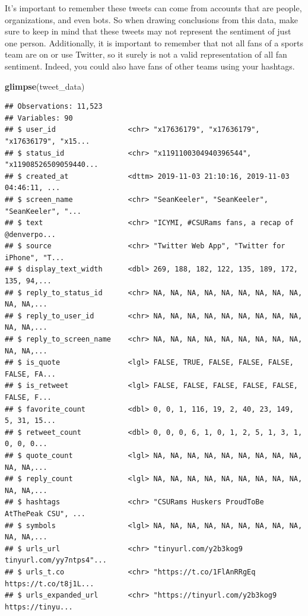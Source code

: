 \documentclass[]{book}
\newenvironment{Shaded}{\begin{snugshade}}{\end{snugshade}}
\newcommand{\KeywordTok}[1]{\textcolor[rgb]{0.13,0.29,0.53}{\textbf{#1}}}
\newcommand{\NormalTok}[1]{#1}
\begin{document}
It's important to remember these tweets can come from accounts that are people, organizations, and even bots. So when drawing conclusions from this data, make sure to keep in mind that these tweets may not represent the sentiment of just one person. Additionally, it is important to remember that not all fans of a sports team are on or use Twitter, so it surely is not a valid representation of all fan sentiment. Indeed, you could also have fans of other teams using your hashtags.

\begin{Shaded}
\begin{Highlighting}[]
\KeywordTok{glimpse}\NormalTok{(tweet_data)}
\end{Highlighting}
\end{Shaded}

\begin{verbatim}
## Observations: 11,523
## Variables: 90
## $ user_id                 <chr> "x17636179", "x17636179", "x17636179", "x15...
## $ status_id               <chr> "x1191100304940396544", "x11908526509059440...
## $ created_at              <dttm> 2019-11-03 21:10:16, 2019-11-03 04:46:11, ...
## $ screen_name             <chr> "SeanKeeler", "SeanKeeler", "SeanKeeler", "...
## $ text                    <chr> "ICYMI, #CSURams fans, a recap of @denverpo...
## $ source                  <chr> "Twitter Web App", "Twitter for iPhone", "T...
## $ display_text_width      <dbl> 269, 188, 182, 122, 135, 189, 172, 135, 94,...
## $ reply_to_status_id      <chr> NA, NA, NA, NA, NA, NA, NA, NA, NA, NA, NA,...
## $ reply_to_user_id        <chr> NA, NA, NA, NA, NA, NA, NA, NA, NA, NA, NA,...
## $ reply_to_screen_name    <chr> NA, NA, NA, NA, NA, NA, NA, NA, NA, NA, NA,...
## $ is_quote                <lgl> FALSE, TRUE, FALSE, FALSE, FALSE, FALSE, FA...
## $ is_retweet              <lgl> FALSE, FALSE, FALSE, FALSE, FALSE, FALSE, F...
## $ favorite_count          <dbl> 0, 0, 1, 116, 19, 2, 40, 23, 149, 5, 31, 15...
## $ retweet_count           <dbl> 0, 0, 0, 6, 1, 0, 1, 2, 5, 1, 3, 1, 0, 0, 0...
## $ quote_count             <lgl> NA, NA, NA, NA, NA, NA, NA, NA, NA, NA, NA,...
## $ reply_count             <lgl> NA, NA, NA, NA, NA, NA, NA, NA, NA, NA, NA,...
## $ hashtags                <chr> "CSURams Huskers ProudToBe AtThePeak CSU", ...
## $ symbols                 <lgl> NA, NA, NA, NA, NA, NA, NA, NA, NA, NA, NA,...
## $ urls_url                <chr> "tinyurl.com/y2b3kog9 tinyurl.com/yy7ntps4"...
## $ urls_t.co               <chr> "https://t.co/1FlAnRRgEq https://t.co/t8j1L...
## $ urls_expanded_url       <chr> "https://tinyurl.com/y2b3kog9 https://tinyu...

\end{verbatim}
\end{document}
